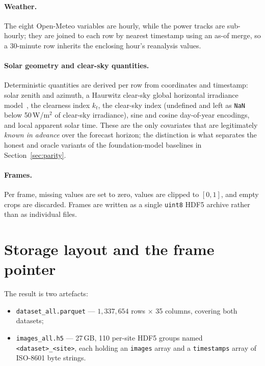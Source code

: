 \paragraph{Weather.} The eight Open-Meteo variables are hourly, while the power tracks are
sub-hourly; they are joined to each row by nearest timestamp using an as-of merge, so a
30-minute row inherits the enclosing hour's reanalysis values.

\paragraph{Solar geometry and clear-sky quantities.} Deterministic quantities are derived
per row from coordinates and timestamp: solar zenith and azimuth, a Haurwitz clear-sky
global horizontal irradiance model~\cite{haurwitz}, the clearness index $k_t$, the clear-sky
index (undefined and left as \texttt{NaN} below 50\,W/m$^2$ of clear-sky irradiance),
sine and cosine day-of-year encodings, and local apparent solar time. These are the only
covariates that are legitimately \emph{known in advance} over the forecast horizon; the
distinction is what separates the honest and oracle variants of the foundation-model
baselines in Section~\ref{sec:parity}.

\paragraph{Frames.} Per frame, missing values are set to zero, values are clipped to
$[0,1]$, and empty crops are discarded. Frames are written as a single \texttt{uint8} HDF5
archive rather than as individual files.

\section{Storage layout and the frame pointer}
\label{sec:layout}

The result is two artefacts:

\begin{itemize}
  \item \texttt{dataset\_all.parquet} --- $1{,}337{,}654$ rows $\times$ 35 columns, covering
    both datasets;
  \item \texttt{images\_all.h5} --- 27\,GB, 110 per-site HDF5 groups named
    \texttt{<dataset>\_<site>}, each holding an \texttt{images} array and a
    \texttt{timestamps} array of ISO-8601 byte strings.
\end{itemize}

